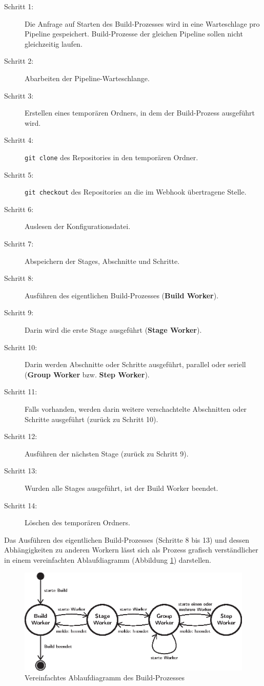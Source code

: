 \begin{description}
  \item[Schritt 1:] Die Anfrage auf Starten des Build-Prozesses wird in eine Warteschlage pro Pipeline gespeichert. Build-Prozesse der gleichen Pipeline sollen nicht gleichzeitig laufen.
  \item[Schritt 2:] Abarbeiten der Pipeline-Warteschlange.
  \item[Schritt 3:] Erstellen eines temporären Ordners, in dem der Build-Prozess ausgeführt wird.
  \item[Schritt 4:] \texttt{git clone} des Repositories in den temporären Ordner.
  \item[Schritt 5:] \texttt{git checkout} des Repositories an die im Webhook übertragene Stelle.
  \item[Schritt 6:] Auslesen der Konfigurationsdatei.
  \item[Schritt 7:] Abspeichern der Stages, Abschnitte und Schritte.
  \item[Schritt 8:] Ausführen des eigentlichen Build-Prozesses (\textbf{Build Worker}).
  \item[Schritt 9:] Darin wird die erste Stage ausgeführt (\textbf{Stage Worker}).
  \item[Schritt 10:] Darin werden Abschnitte oder Schritte ausgeführt, parallel oder seriell (\textbf{Group Worker} bzw. \textbf{Step Worker}).
  \item[Schritt 11:] Falls vorhanden, werden darin weitere verschachtelte Abschnitten oder Schritte ausgeführt (zurück zu Schritt 10).
  \item[Schritt 12:] Ausführen der nächsten Stage (zurück zu Schritt 9).
  \item[Schritt 13:] Wurden alle Stages ausgeführt, ist der Build Worker beendet.
  \item[Schritt 14:] Löschen des temporären Ordners.
\end{description}

Das Ausführen des eigentlichen Build-Prozesses (Schritte 8 bis 13) und dessen Abhängigkeiten zu anderen Workern lässt sich als Prozess grafisch verständlicher in einem vereinfachten Ablaufdiagramm (Abbildung \ref{fig:ablauf-build-prozess}) darstellen.

\begin{figure}[h]
  \caption{Vereinfachtes Ablaufdiagramm des Build-Prozesses}
  \label{fig:ablauf-build-prozess}
  \centering
    \includegraphics[width=\textwidth]{assets/worker_diagram}
\end{figure}

